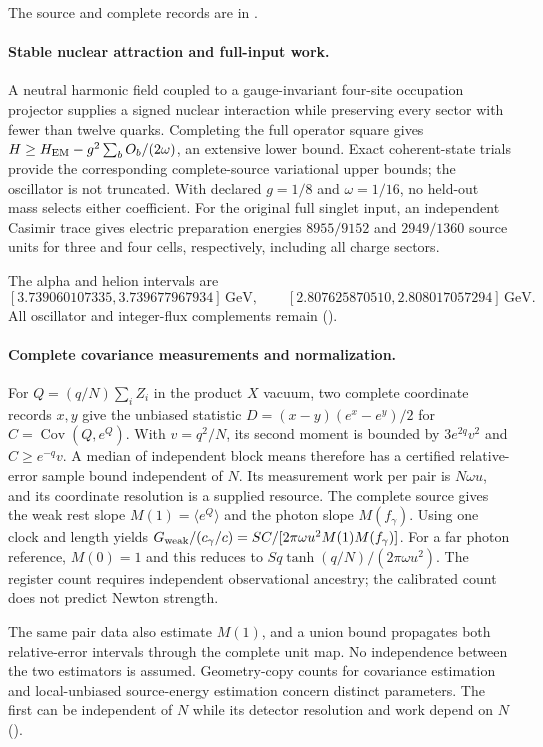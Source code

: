 The source and complete records are in .

\paragraph{Stable nuclear attraction and full-input work.}
A neutral harmonic field coupled to a gauge-invariant four-site occupation
projector supplies a signed nuclear interaction while preserving every
sector with fewer than twelve quarks. Completing the full operator square
gives \(H\geq H_{\rm EM}-g^2\sum_b O_b/(2\omega)\), an extensive lower
bound. Exact coherent-state trials provide the corresponding complete-source
variational upper bounds; the oscillator is not truncated. With declared
\(g=1/8\) and \(\omega=1/16\), no held-out mass selects either coefficient. For the original full singlet
input, an independent Casimir trace gives electric preparation energies
\(8955/9152\) and \(2949/1360\) source units for three and four cells,
respectively, including all charge sectors.

The alpha and helion intervals are
\[
 [3.739060107335,3.739677967934]\,\mathrm{GeV},\qquad
 [2.807625870510,2.808017057294]\,\mathrm{GeV}.
\]
All oscillator and integer-flux complements remain
().

\paragraph{Complete covariance measurements and normalization.}
For $Q=(q/N)\sum_i Z_i$ in the product $X$ vacuum, two complete coordinate
records $x,y$ give the unbiased statistic
$D=(x-y)(e^x-e^y)/2$ for $C=\operatorname{Cov}(Q,e^Q)$.
With $v=q^2/N$, its second moment is bounded by $3e^{2q}v^2$ and
$C\geq e^{-q}v$. A median of independent block means therefore has a
certified relative-error sample bound independent of $N$. Its measurement
work per pair is $N\omega u$, and its coordinate resolution is a supplied
resource. The complete source gives the weak rest slope
$M(1)=\langle e^Q\rangle$ and the photon slope $M(f_\gamma)$.
Using one clock and length yields
$G_{\rm weak}/(c_\gamma/c)=S C/[2\pi\omega u^2M(1)M(f_\gamma)]$.
For a far photon reference, $M(0)=1$ and this reduces to
$S q\tanh(q/N)/(2\pi\omega u^2)$.
The register count requires independent observational ancestry; the
calibrated count does not predict Newton strength.

The same pair data also estimate $M(1)$, and a union bound propagates both
relative-error intervals through the complete unit map. No independence
between the two estimators is assumed. Geometry-copy counts for covariance
estimation and local-unbiased source-energy estimation concern distinct
parameters. The first can be independent of $N$ while its detector
resolution and work depend on $N$
().


